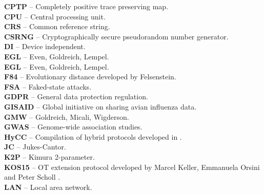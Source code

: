 \textbf{CPTP} -- Completely positive trace preserving map.
\vspace{0.5cm}\\
\textbf{CPU} -- Central processing unit.
\vspace{0.5cm}\\
\textbf{CRS} -- Common reference string.
\vspace{0.5cm}\\
\textbf{CSRNG} -- Cryptographically secure pseudorandom number generator.
\vspace{0.5cm}\\
\textbf{DI} -- Device independent.
\vspace{0.5cm}\\
\textbf{EGL} -- Even, Goldreich, Lempel.
\vspace{0.5cm}\\
\textbf{EGL} -- Even, Goldreich, Lempel.
\vspace{0.5cm}\\
\textbf{F84} -- Evolutionary distance developed by Felsenstein.
\vspace{0.5cm}\\
\textbf{FSA} -- Faked-state attacks.
\vspace{0.5cm}\\
\textbf{GDPR} -- General data protection regulation.
\vspace{0.5cm}\\
\textbf{GISAID} -- Global initiative on sharing avian influenza data.
\vspace{0.5cm}\\
\textbf{GMW} -- Goldreich, Micali, Wigderson.
\vspace{0.5cm}\\
\textbf{GWAS} -- Genome-wide association studies.
\vspace{0.5cm}\\
\textbf{HyCC} -- Compilation of hybrid protocols developed in \cite{Bscher2018}.
\vspace{0.5cm}\\
\textbf{JC} -- Jukes-Cantor.
\vspace{0.5cm}\\
\textbf{K2P} -- Kimura 2-parameter.
\vspace{0.5cm}\\
\textbf{KOS15} -- OT extension protocol developed by Marcel Keller, Emmanuela Orsini and Peter Scholl \cite{KOS15}.
\vspace{0.5cm}\\
\textbf{LAN} -- Local area network.
\vspace{0.5cm}\\
